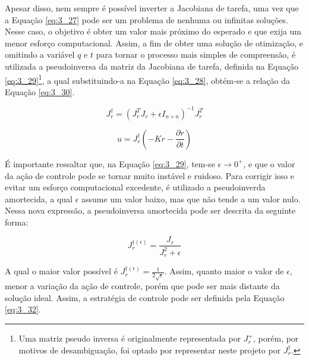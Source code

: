 
Apesar disso, nem sempre é possível inverter a Jacobiana de tarefa, uma vez que a Equação \ref{eq:3_27} pode ser um problema de nenhuma ou infinitas soluções. Nesse caso, o objetivo é obter um valor mais próximo do esperado e que exija um menor esforço computacional. Assim, a fim de obter uma solução de otimização, e omitindo a variável $q$ e $t$ para tornar o processo mais simples de compreensão, é utilizada a pseudoinversa da matriz da Jacobiana de tarefa, definida na Equação \ref{eq:3_29}\footnote{Uma matriz pseudo inversa é originalmente representada por $J_r^+$, porém, por motivos de desambiguação, foi optado por representar neste projeto por $J_r^{\dagger}$.}, a qual substituindo-a na Equação \ref{eq:3_28}, obtém-se a relação da Equação \ref{eq:3_30}.

\begin{equation}
J_r^{\dagger} = (J_r^T J_r + \epsilon I_{n\times n})^{-1} J_r^T
\label{eq:3_29}
\end{equation}

\begin{equation}
u = J_r^{\dagger} (-Kr - \frac{\partial r}{\partial t})
\label{eq:3_30}
\end{equation}

É importante ressaltar que, na Equação \ref{eq:3_29}, tem-se $\epsilon \rightarrow 0^+$, e que o valor da ação de controle pode se tornar muito instável e ruidoso. Para corrigir isso e evitar um esforço computacional excedente, é utilizado a pseudoinverda amortecida, a qual $\epsilon$ assume um valor baixo, mas que não tende a um valor nulo. Nessa nova expressão, a pseudoinversa amortecida pode ser descrita da seguinte forma:

\begin{equation}
J_r^{\dagger (\epsilon)} = \frac{J_r}{J_r^2 + \epsilon}
\label{eq:3_31}
\end{equation}

A qual o maior valor possível é $J_r^{\dagger (\epsilon)} = \frac{1}{2 \sqrt{\epsilon}}$. Assim, quanto maior o valor de $\epsilon$, menor a variação da ação de controle, porém que pode ser mais distante da solução ideal. Assim, a estratégia de controle pode ser definida pela Equação \ref{eq:3_32}.

